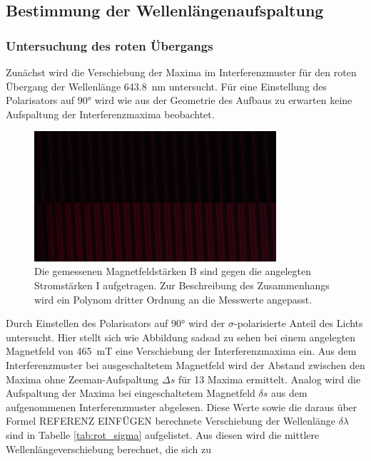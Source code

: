         \FloatBarrier

    
    \subsection{Bestimmung der Wellenlängenaufspaltung}
        \subsubsection*{Untersuchung des roten Übergangs}
            Zunächst wird die Verschiebung der Maxima im Interferenzmuster für den roten Übergang der Wellenlänge \SI{643.8}{\nano\metre} untersucht. Für eine Einstellung des Polarisators auf 90° wird wie aus
            der Geometrie des Aufbaus zu erwarten keine Aufspaltung der Interferenzmaxima beobachtet.

            \FloatBarrier

            \begin{figure}[h]
              \centering
              \includegraphics[width = 0.8\textwidth]{pictures/rot_sigma.png}
              \caption{Die gemessenen Magnetfeldstärken B sind gegen die angelegten Stromstärken I aufgetragen. Zur Beschreibung des Zusammenhangs wird ein Polynom dritter Ordnung an die Messwerte angepasst.}
              \label{fig:rot_sigma}
            \end{figure}
        
            \FloatBarrier

            Durch Einstellen des Polarisators auf 90° wird der $\sigma$-polarisierte Anteil des Lichts untersucht. Hier stellt sich wie Abbildung sadsad zu sehen bei einem angelegten Magnetfeld von 
            \SI{465}{\milli\tesla} eine Verschiebung der Interferenzmaxima ein. Aus dem Interferenzmuster bei ausgeschaltetem Magnetfeld wird der Abstand zwischen den Maxima ohne Zeeman-Aufspaltung $\Delta s$
            für 13 Maxima ermittelt. Analog wird die Aufspaltung der Maxima bei eingeschaltetem Magnetfeld $\delta s$ aus dem aufgenommenen Interferenzmuster abgelesen. Diese Werte sowie die daraus über Formel
            REFERENZ EINFÜGEN berechnete Verschiebung der Wellenlänge $\delta\lambda$ sind in Tabelle \ref{tab:rot_sigma} aufgelistet. Aus diesen wird die mittlere Wellenlängeverschiebung berechnet, die sich 
            zu

